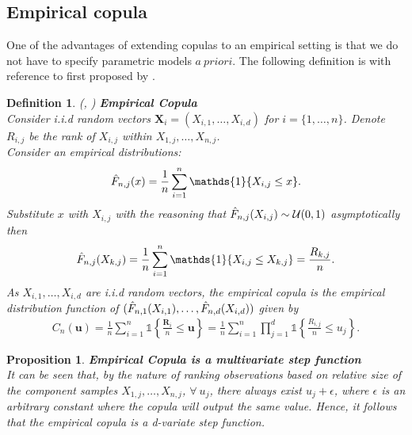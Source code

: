 \documentclass[12pt]{report}
\newtheorem{proposition}{Proposition}[section]
\newtheorem{definition}{Definition}[subsection]
\newcommand{\1}{\mathbf{1}}
\begin{document}
\begin{flushleft}
\newpage
\subsection{Empirical copula}
\vspace{0.5cm}
One of the advantages of extending copulas to an empirical setting is that we do not have to specify parametric models $a \: priori$. The following definition is with reference to \cite{SegersEBC} first proposed by \cite{DeheuvelsEC}.

\begin{definition}\label{ECDef}
\textit{(\normalfont\cite{DeheuvelsEC}, \normalfont\cite{SegersEBC})}
\:\textbf{Empirical Copula} \\
Consider i.i.d random vectors $\boldsymbol{X}_{i} = (X_{i,1}, \dots, X_{i,d})$ for $i = \{1, \dots, n \}$. Denote $R_{i,j}$ be the rank of $X_{i,j}$ within $X_{1,j}, \dots, X_{n,j}$.\\
Consider an empirical distributions:
\begin{align*}
\Hat{F}_{n,j}(x) = \frac{1}{n} \sum\limits_{i = 1}^{n} \mathds{1}\{X_{i,j} \le x\}.
\end{align*}
Substitute $x$ with $X_{i,j}$ with the reasoning that $\Hat{F}_{n,j}(X_{i,j}) \sim \mathcal{U}(0,1)$ asymptotically then
\begin{align*}
\Hat{F}_{n,j}(X_{k,j}) = \frac{1}{n} \sum\limits_{i = 1}^{n} \mathds{1}\{X_{i,j} \le X_{k,j}\} = \frac{R_{k,j}}{n}.
\end{align*}
As $X_{i,1}, \dots, X_{i,d}$ are i.i.d random vectors, the empirical copula is the empirical distribution function of $(\Hat{F}_{n,1}(X_{i,1}), \dots, \Hat{F}_{n,d}(X_{i,d}))$ given by
\begin{align*}
C_{n}(\textbf{u}) = \frac{1}{n} \sum\limits_{i = 1}^{n} \mathds{1}\left\{ \frac{\boldsymbol{R}_{i}}{n} \le \textbf{u} \right\} = \frac{1}{n} \sum\limits_{i = 1}^{n} \prod\limits_{j = 1}^{d} \mathds{1}\left\{ \frac{R_{i,j}}{n} \le u_{j} \right\}.
\end{align*}
\end{definition}
\vspace{0.5cm}
\begin{proposition}\label{ECisStepFunction}
\textbf{Empirical Copula is a multivariate step function} \\
It can be seen that, by the nature of ranking observations based on relative size of the component samples $X_{1,j}, \dots, X_{n,j}$, $\forall \: u_{j}$, there always exist $u_{j} + \epsilon$, where $\epsilon$ is an arbitrary constant where the copula will output the same value. Hence, it follows that the empirical copula is a d-variate step function.  
\end{proposition}


\end{flushleft}
\end{document}
